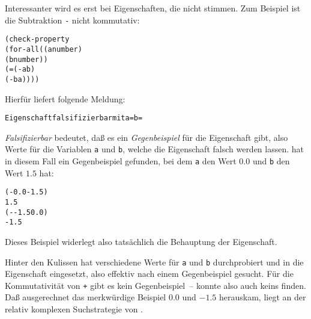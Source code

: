 Interessanter wird es erst bei Eigenschaften, die nicht stimmen.  Zum
Beispiel ist die Subtraktion \texttt{-} nicht kommutativ:
%
\begin{alltt}
(check-property
 (for-all ((a number)
           (b number))
   (= (- a b)
      (- b a))))
\end{alltt}
%
Hierfür liefert \drscheme{} folgende Meldung:
%
\begin{alltt}
        Eigenschaft falsifizierbar mit a =  b = 
\end{alltt}
%
\textit{Falsifizierbar} bedeutet, daß es ein
\textit{Gegenbeispiel} für die Eigenschaft gibt,
also Werte für die Variablen \texttt{a} und \texttt{b}, welche die
Eigenschaft falsch werden lassen.  \drscheme{} hat in diesem Fall ein
Gegenbeispiel gefunden, bei dem \texttt{a} den Wert $0.0$ und
\texttt{b} den Wert $1.5$ hat:
%
\begin{alltt}
(- 0.0 -1.5)
\evalsto{} 1.5
(- -1.5 0.0)
\evalsto{} -1.5
\end{alltt}
%
Dieses Beispiel widerlegt also tatsächlich die Behauptung der Eigenschaft.

Hinter den Kulissen hat \drscheme{} verschiedene Werte für \texttt{a} und
\texttt{b} durchprobiert und in die Eigenschaft eingesetzt, also effektiv
nach einem Gegenbeispiel gesucht.  Für die Kommutativität von
\texttt{+} gibt es kein Gegenbeispiel~-- \drscheme{} konnte also auch
keins finden.  Daß ausgerechnet das merkwürdige Beispiel $0.0$ und
$-1.5$ herauskam, liegt an der relativ komplexen Suchstrategie von
\drscheme{}.

